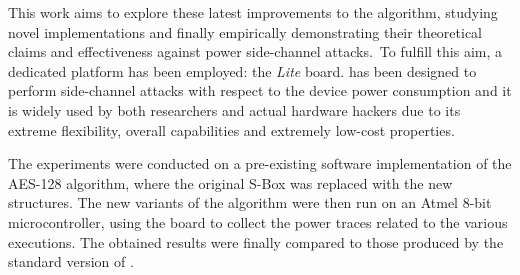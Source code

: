 This work aims to explore these latest improvements to the \aes{} algorithm, studying novel \sbocs{} implementations and finally empirically demonstrating their theoretical claims and effectiveness against power side-channel attacks. To fulfill this aim, a dedicated platform has been employed: the \cw{} \textit{Lite} board. \cw{} has been designed to perform side-channel attacks with respect to the device power consumption and it is widely used by both researchers and actual hardware hackers due to its extreme flexibility, overall capabilities and extremely low-cost properties.

The experiments were conducted on a pre-existing software implementation of the AES-128 algorithm, where the original S-Box was replaced with the new structures. The new variants of the algorithm were then run on an Atmel 8-bit microcontroller, using the \cw{} board to collect the power traces related to the various executions. The obtained results were finally compared to those produced by the standard version of \aes{}.